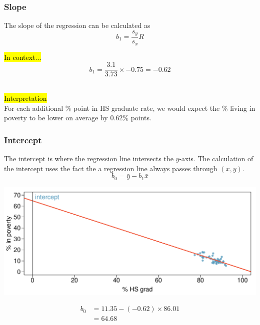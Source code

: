 
\begin{frame}
\frametitle{Slope}

{The slope of the regression can be calculated as 
\[ b_1 = \frac{s_y}{s_x} R \]
}

\pause

\hl{In context...}
\[ b_1 = \frac{3.1}{3.73} \times -0.75 = -0.62 \]

\pause
$\:$ \\
\hl{Interpretation} \\
For each additional \% point in HS graduate rate, we would expect the \% living in poverty to be lower on average by 0.62\% points.

\end{frame}


\begin{frame}
\frametitle{Intercept}

{The intercept is where the regression line intersects the $y$-axis. The calculation of the intercept uses the fact the a regression line always passes through $(\bar{x},\bar{y})$.
\[ b_0 = \bar{y} - b_1 \bar{x} \]
}

\pause

{
\begin{center}
\includegraphics[width=\textwidth]{8-2_least_square_reg/figures/poverty/poverty_hsgrad_line_wide}
\end{center}
}
{
\pause
\begin{align*}
b_0 &= 11.35 - (-0.62) \times 86.01 \\
&= 64.68
\end{align*}
}

\end{frame}



